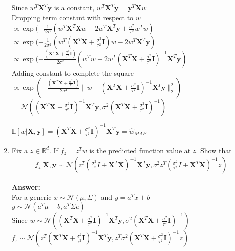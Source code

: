 \documentclass{article}
\newcommand{\field}[1]{\mathbb{#1}}
\newcommand{\mb}[1]{\mathbf{#1}}
\newcommand{\1}{\mathbf{1}}
\newcommand{\E}{\mathbb{E}} %
\newcommand{\R}{\field{R}} %
\begin{document}
\begin{enumerate}
  Since $w^T\mb{X}^T \mb{y}$ is a constant, $w^T\mb{X}^T \mb{y}=\mb{y}^T\mb{X} w$\\
  Dropping term constant with respect to $w$\\  
  
  $\propto \exp(-\frac{1}{2 \sigma^2 }(w^T\mb{X}^T \mb{X} w-2 w^T\mb{X}^T \mb{y}+\frac{\sigma^2}{\tau^2} w^T w)$\\  
   $\propto \exp(-\frac{1}{2 \sigma^2 }(w^T(\mb{X}^T \mb{X} +\frac{\sigma^2}{\tau^2} \mb{I})w-2 w^T\mb{X}^T \mb{y})$\\  
   $\propto \exp(-\frac{(\mb{X}^T \mb{X} +\frac{\sigma^2}{\tau^2} \mb{I})}{2 \sigma^2 }(w^T w-2 w^T (\mb{X}^T \mb{X} +\frac{\sigma^2}{\tau^2} \mb{I})^{-1}\mb{X}^T \mb{y})$\\     
   
   Adding constant to complete the square\\
   $\propto \exp(-\frac{(\mb{X}^T \mb{X} +\frac{\sigma^2}{\tau^2} \mb{I})}{2 \sigma^2 }\|w-(\mb{X}^T \mb{X} +\frac{\sigma^2}{\tau^2} \mb{I})^{-1}\mb{X}^T \mb{y}\|_2^2)$\\     
$=\mathcal{N}((\mb{X}^T \mb{X} +\frac{\sigma^2}{\tau^2} \mb{I})^{-1}\mb{X}^T \mb{y},\sigma^2 (\mb{X}^T \mb{X} +\frac{\sigma^2}{\tau^2} \mb{I})^{-1})$

$\E[w | \mb{X}, \mb{y} ]=(\mb{X}^T \mb{X} +\frac{\sigma^2}{\tau^2} \mb{I})^{-1}\mb{X}^T \mb{y}=\widehat{w}_{MAP}$
  
  \item Fix a $z \in \R^d$. If $f_z = z^T w$ is the predicted function value at $z$. Show that
  \begin{align*}
    f_z | \mb{X},\mb{y} \sim \mathcal{N}( z^T( \tfrac{\sigma^2}{\tau^2}I + \mb{X}^T \mb{X})^{-1} \mb{X}^T \mb{y}, \sigma^2 z^T ( \tfrac{\sigma^2}{\tau^2}I + \mb{X}^T \mb{X})^{-1} z )
  \end{align*}
  
  \textbf{Answer:}\\
  For a generic $x \sim \mathcal{N}(\mu,\Sigma)$ and $y=a^T x +b$\\
  $y \sim \mathcal{N}(a^T \mu+b , a^T \Sigma a)$\\
  
  Since $w\sim \mathcal{N}((\mb{X}^T \mb{X} +\frac{\sigma^2}{\tau^2} \mb{I})^{-1}\mb{X}^T \mb{y},\sigma^2 (\mb{X}^T \mb{X} +\frac{\sigma^2}{\tau^2} \mb{I})^{-1})$\\
 $ f_z \sim \mathcal{N}(z^T(\mb{X}^T \mb{X} +\frac{\sigma^2}{\tau^2} \mb{I})^{-1}\mb{X}^T \mb{y},z^T \sigma^2 (\mb{X}^T \mb{X} +\frac{\sigma^2}{\tau^2} \mb{I})^{-1} z)$
  

\end{enumerate}
\end{document}
